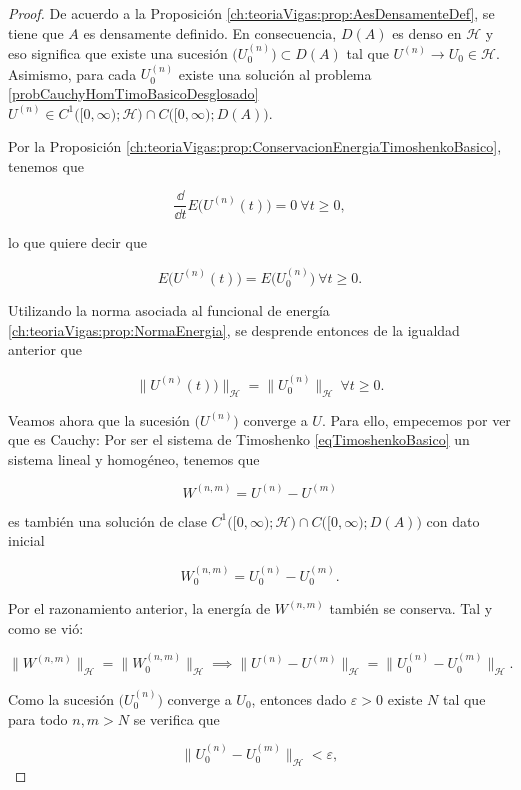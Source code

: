 \begin{proof}
    De acuerdo a la Proposición \ref{ch:teoriaVigas:prop:AesDensamenteDef}, se tiene que $A$ es densamente definido. En consecuencia, $D(A)$ es denso en $\mathcal{H}$ y eso significa que existe una sucesión $\Big(U_0^{(n)}\Big) \subset D(A)$ tal que $U^{(n)} \rightarrow U_0 \in \mathcal{H}$. Asimismo, para cada $U_0^{(n)}$ existe una solución al problema \eqref{probCauchyHomTimoBasicoDesglosado} $U^{(n)} \in C^1\big([0,\infty); \mathcal{H}\big) \cap C\big([0,\infty); D(A) \big)$.

    Por la Proposición \ref{ch:teoriaVigas:prop:ConservacionEnergiaTimoshenkoBasico}, tenemos que

    \[\frac{\dd}{\dd t}E\big(U^{(n)}(t)\big) = 0 \ \forall t \geq 0,\]

    lo que quiere decir que

    \[E\big(U^{(n)}(t)\big) = E\big(U^{(n)}_0\big) \ \forall t \geq 0.\]

    Utilizando la norma asociada al funcional de energía \ref{ch:teoriaVigas:prop:NormaEnergia}, se desprende entonces de la igualdad anterior que

    \[\big\lVert U^{(n)}(t)\big)\rVert_{\mathcal{H}} = \big\lVert U^{(n)}_0\big\rVert_{\mathcal{H}} \ \forall t \geq 0.\]

    Veamos ahora que la sucesión $\big(U^{(n)}\big)$ converge a $U$. Para ello, empecemos por ver que es Cauchy: Por ser el sistema de Timoshenko \eqref{eqTimoshenkoBasico} un sistema lineal y homogéneo, tenemos que

    \[W^{(n,m)} = U^{(n)} - U^{(m)}\]

    es también una solución de clase $C^1\big([0,\infty); \mathcal{H}\big) \cap C\big([0,\infty); D(A) \big)$ con dato inicial

    \[W^{(n,m)}_0 = U^{(n)}_0 - U^{(m)}_0.\]

    Por el razonamiento anterior, la energía de $W^{(n,m)}$ también se conserva. Tal y como se vió:

    \[\big \lVert W^{(n,m)}\big \rVert_{\mathcal{H}} = \big \lVert W^{(n,m)}_0 \big \rVert_{\mathcal{H}} \implies \big \lVert U^{(n)} - U^{(m)} \big \rVert_{\mathcal{H}} = \big \lVert  U^{(n)}_0 - U^{(m)}_0 \big \rVert_{\mathcal{H}}.\]

    Como la sucesión $\big(U^{(n)}_0 \big)$ converge a $U_0$, entonces dado $\varepsilon > 0$ existe $N$ tal que para todo $n,m > N$ se verifica que

    \[\big \lVert  U^{(n)}_0 - U^{(m)}_0 \big \rVert_{\mathcal{H}} < \varepsilon,\]


\end{proof}

